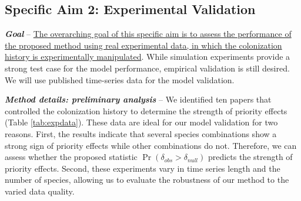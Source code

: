 \documentclass[12pt, class=article, crop=false]{standalone}
\begin{document}




\subsection*{Specific Aim 2: Experimental Validation}

\textbf{\textit{Goal}} -- 
\ul{The overarching goal of this specific aim is to assess the performance of the proposed method using real experimental data, in which the colonization history is experimentally manipulated}.
While simulation experiments provide a strong test case for the model performance, empirical validation is still desired.
We will use published time-series data for the model validation.

\textit{\textbf{Method details: preliminary analysis}} --
We identified ten papers that controlled the colonization history to determine the strength of priority effects (Table \ref{tab:expdata}).
These data are ideal for our model validation for two reasons.
First, the results indicate that several species combinations show a strong sign of priority effects while other combinations do not.
Therefore, we can assess whether the proposed statistic $\Pr(\delta_{obs} > \delta_{null})$ predicts the strength of priority effects.
Second, these experiments vary in time series length and the number of species, allowing us to evaluate the robustness of our method to the varied data quality.
\end{document}
